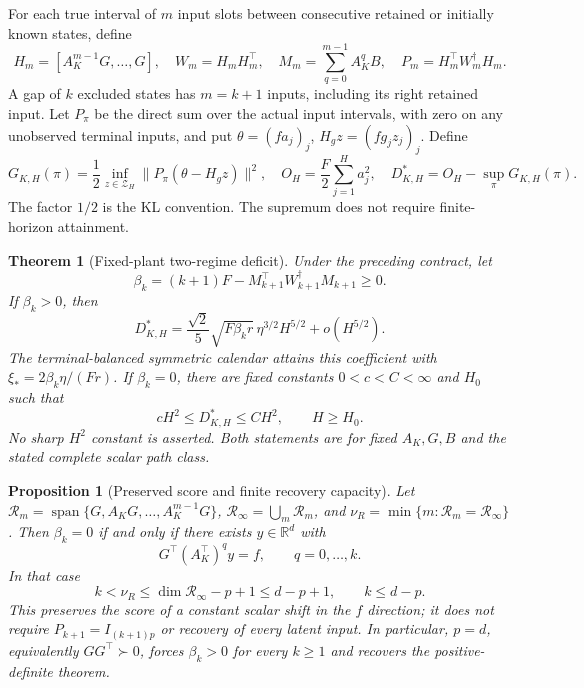 \documentclass[11pt]{article}
\newtheorem{theorem}{Theorem}
\newtheorem{proposition}{Proposition}
\begin{document}
For each true interval of $m$ input slots between consecutive
retained or initially known states, define
\begin{equation}\label{m2sreg:interval}
H_m=[A_K^{m-1}G,\ldots,G],\quad W_m=H_mH_m^\top,\quad
M_m=\sum_{q=0}^{m-1}A_K^qB,\quad P_m=H_m^\top W_m^\dagger H_m .
\end{equation}
A gap of $k$ excluded states has $m=k+1$ inputs, including its right
retained input. Let $P_\pi$ be the direct sum over the actual input
intervals, with zero on any unobserved terminal inputs, and put
$\theta=(fa_j)_j$, $H_gz=(fg_jz_j)_j$.
Define
\begin{equation}\label{m2sreg:information}
G_{K,H}(\pi)=\frac12\inf_{z\in\mathcal Z_H}
 \|P_\pi(\theta-H_gz)\|^2,\quad
O_H=\frac F2\sum_{j=1}^Ha_j^2,\quad
D_{K,H}^*=O_H-\sup_\pi G_{K,H}(\pi).
\end{equation}
The factor $1/2$ is the KL convention. The supremum does not require
finite-horizon attainment.

\begin{theorem}[Fixed-plant two-regime deficit]\label{m2sreg:theorem}
Under the preceding contract, let
\[
\beta_k=(k+1)F-M_{k+1}^\top W_{k+1}^\dagger M_{k+1}\ge0.
\]
If $\beta_k>0$, then
\begin{equation}\label{m2sreg:positive}
D_{K,H}^*=\frac{\sqrt2}{5}\sqrt{F\beta_k r}\,
 \eta^{3/2}H^{5/2}+o(H^{5/2}).
\end{equation}
The terminal-balanced symmetric calendar attains this coefficient with
$\xi_*=2\beta_k\eta/(Fr)$.
If $\beta_k=0$, there are fixed constants $0<c<C<\infty$ and $H_0$
such that
\begin{equation}\label{m2sreg:zero}
cH^2\le D_{K,H}^*\le CH^2,\qquad H\ge H_0 .
\end{equation}
No sharp $H^2$ constant is asserted. Both statements are for fixed
$A_K,G,B$ and the stated complete scalar path class.
\end{theorem}

\begin{proposition}[Preserved score and finite recovery capacity]
\label{m2sreg:capacity}
Let $\mathcal R_m=\operatorname{span}\{G,A_KG,\ldots,A_K^{m-1}G\}$,
$\mathcal R_\infty=\bigcup_m\mathcal R_m$, and
$\nu_R=\min\{m:\mathcal R_m=\mathcal R_\infty\}$.
Then $\beta_k=0$ if and only if there exists $y\in\mathbb R^d$ with
\begin{equation}\label{m2sreg:score}
G^\top(A_K^\top)^q y=f,\qquad q=0,\ldots,k.
\end{equation}
In that case
\begin{equation}\label{m2sreg:dimension}
k<\nu_R\le\dim\mathcal R_\infty-p+1\le d-p+1,
\qquad k\le d-p.
\end{equation}
This preserves the score of a constant scalar shift in the $f$ direction;
it does not require $P_{k+1}=I_{(k+1)p}$ or recovery of every latent input.
In particular, $p=d$, equivalently $GG^\top\succ0$, forces
$\beta_k>0$ for every $k\ge1$ and recovers the positive-definite theorem.
\end{proposition}
\end{document}

